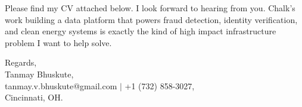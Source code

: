 \documentclass[11pt]{letter}
\begin{document}
\begin{letter}{}
Please find my CV attached below. I look forward to hearing from you. Chalk's work building a data platform that powers fraud detection, identity verification, and clean energy systems is exactly the kind of high impact infrastructure problem I want to help solve.

{\setlength{\parskip}{0pt}
Regards,\\
Tanmay Bhuskute,\\
tanmay.v.bhuskute@gmail.com $\mid$ +1 (732) 858-3027,\\
Cincinnati, OH.
}

\end{letter}
\end{document}
